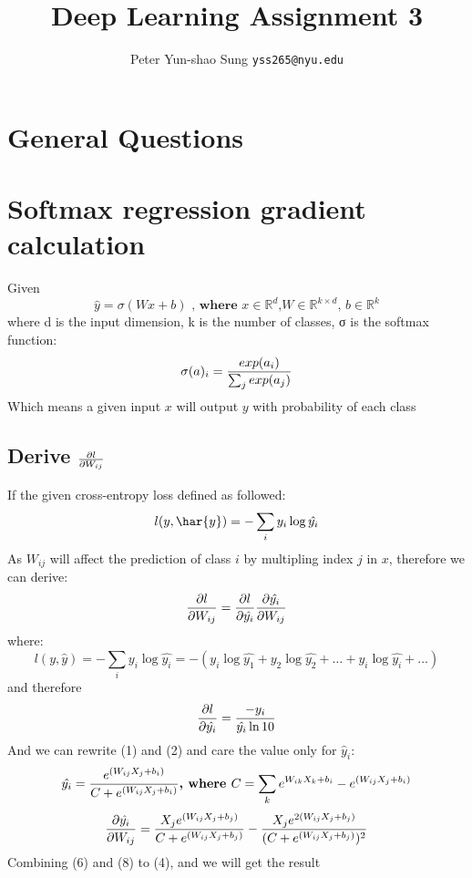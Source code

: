 \documentclass{article}
\title{Deep Learning Assignment 3}
\author{
  Peter Yun-shao Sung
  \texttt{yss265@nyu.edu} \\
}
\begin{document}

\maketitle
\section{General Questions}

\section{Softmax regression gradient calculation}
Given
\begin{equation}
\hat{y} = \sigma (Wx+b) \textbf{ , where $x \in \mathbb{R}^d$,$W \in \mathbb{R}^{k\times d}$, $b \in \mathbb{R}^k$}
\end{equation}
where d is the input dimension, k is the number of classes, σ is the softmax function:
\begin{equation}
\sigma(a)_i = {exp(a_i) \over \sum_j exp(a_j)}
\end{equation}
Which means a given input $x$ will output $y$ with probability of each class

\subsection{Derive ${\partial l\over \partial W_{ij}}$}
If the given cross-entropy loss defined as followed:
\begin{equation}
l(y, \har{y}) = -\sum_i y_i\log\hat{y_i}
\end{equation}
As $W_{ij}$ will affect the prediction of class $i$ by multipling index $j$ in $x$, therefore we can derive:
\begin{equation}
{\partial l\over \partial W_{ij}} = {\partial l \over \partial \hat{y_i}} {\partial \hat{y_i} \over \partial W_{ij}}
\end{equation}
where:
\begin{equation}
l(y, \hat{y}) = -\sum_i y_i\log\hat{y_i} = -(y_i\log\hat{y_1} + y_2\log\hat{y_2} + \dots + y_i\log\hat{y_i} + \dots)
\end{equation}
and therefore
\begin{equation}
{\partial l \over \partial \hat{y_i}} = {-y_i\over \hat{y_i} \ln 10}
\end{equation}
And we can rewrite (1) and (2) and care the value only for $\hat y_i$:
\begin{equation}
\hat{y_i} = {e^{(W_{ij}X_j+b_i)} \over C + e^{(W_{ij}X_j+b_i)} } \textbf{, where $C = \sum_k e^{W_{ik}X_k+b_i} - e^{(W_{ij}X_j+b_i)}$}
\end{equation}
\begin{equation}
{\partial \hat{y_i} \over \partial W_{ij}} = {X_je^{(W_{ij}X_j+b_j)} \over C + e^{(W_{ij}X_j+b_j)} } - {X_je^{2(W_{ij}X_j+b_j)} \over (C + e^{(W_{ij}X_j+b_j)})^2 }
\end{equation}
Combining (6) and (8) to (4), and we will get the result
\end{document}
